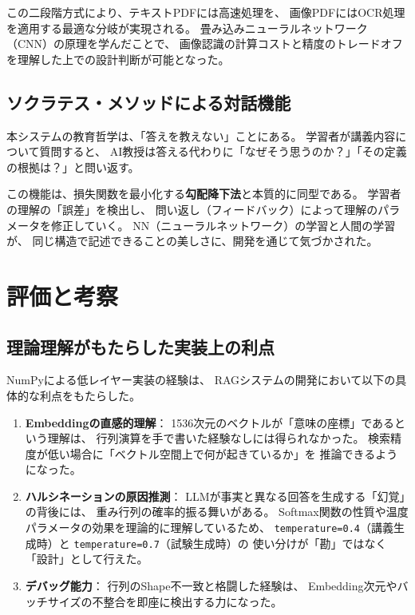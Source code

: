\documentclass[uplatex, dvipdfmx, a4paper, 11pt]{jsarticle}
\begin{document}
この二段階方式により、テキストPDFには高速処理を、
画像PDFにはOCR処理を適用する最適な分岐が実現される。
畳み込みニューラルネットワーク（CNN）の原理を学んだことで、
画像認識の計算コストと精度のトレードオフを理解した上での設計判断が可能となった。

\subsection{ソクラテス・メソッドによる対話機能}
本システムの教育哲学は、「答えを教えない」ことにある。
学習者が講義内容について質問すると、
AI教授は答える代わりに「なぜそう思うのか？」「その定義の根拠は？」と問い返す。

この機能は、損失関数を最小化する\textbf{勾配降下法}と本質的に同型である。
学習者の理解の「誤差」を検出し、
問い返し（フィードバック）によって理解のパラメータを修正していく。
NN（ニューラルネットワーク）の学習と人間の学習が、
同じ構造で記述できることの美しさに、開発を通じて気づかされた。


\section{評価と考察}

\subsection{理論理解がもたらした実装上の利点}
NumPyによる低レイヤー実装の経験は、
RAGシステムの開発において以下の具体的な利点をもたらした。

\begin{enumerate}
    \item \textbf{Embeddingの直感的理解}：
          1536次元のベクトルが「意味の座標」であるという理解は、
          行列演算を手で書いた経験なしには得られなかった。
          検索精度が低い場合に「ベクトル空間上で何が起きているか」を
          推論できるようになった。

    \item \textbf{ハルシネーションの原因推測}：
          LLMが事実と異なる回答を生成する「幻覚」の背後には、
          重み行列の確率的振る舞いがある。
          Softmax関数の性質や温度パラメータの効果を理論的に理解しているため、
          \texttt{temperature=0.4}（講義生成時）と
          \texttt{temperature=0.7}（試験生成時）の
          使い分けが「勘」ではなく「設計」として行えた。

    \item \textbf{デバッグ能力}：
          行列のShape不一致と格闘した経験は、
          Embedding次元やバッチサイズの不整合を即座に検出する力になった。
\end{enumerate}
\end{document}
